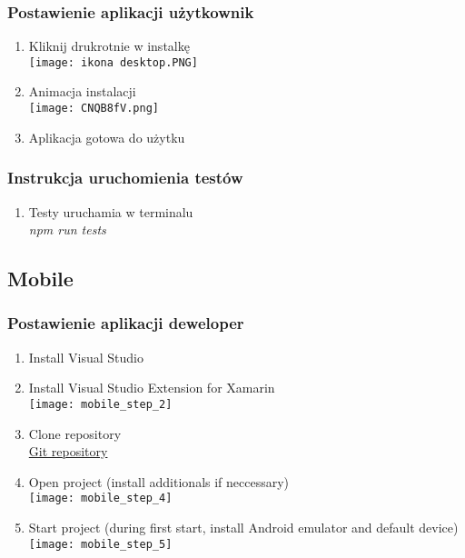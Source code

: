 \documentclass{article}
\begin{document}
        \subsubsection{Postawienie aplikacji użytkownik}
        \begin{enumerate}
            \item Kliknij drukrotnie w instalkę\\
                \texttt{[image: ikona desktop.PNG]}\\
            \item Animacja instalacji\\
                \texttt{[image: CNQB8fV.png]}\\
            \item Aplikacja gotowa do użytku\\
        \end{enumerate}
        
        \subsubsection{Instrukcja uruchomienia testów}
        \begin{enumerate}
            \item Testy uruchamia w terminalu\\
            \emph{npm run tests} \\
        \end{enumerate}
        
    \subsection{Mobile}
        \subsubsection{Postawienie aplikacji deweloper}
         \begin{enumerate}
            \item Install Visual Studio\\
            \item Install Visual Studio Extension for Xamarin\\
                \texttt{[image: mobile\_step\_2]}\\
            \item Clone repository\\
            \href{https://github.com/Price-Tracker-ZMP/Mobile.git}{Git repository}\\
            \item Open project (install additionals if neccessary)\\
                \texttt{[image: mobile\_step\_4]}\\
            \item Start project (during first start, install Android emulator and default device)\\
                \texttt{[image: mobile\_step\_5]}\\
        \end{enumerate}
       
\end{document}
